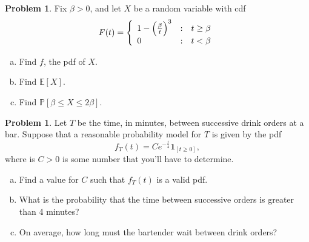 \documentclass[10pt]{article}
\theoremstyle{definition}
\newtheorem{problem}[theorem]{Problem}
\newcommand{\1}[1]{\textbf{1}_{\left[#1\right]}} %
\def\E{\mathbb{E}} %
\def\P{\mathbb{P}} %
\begin{document}
\begin{problem}
  Fix $\beta>0$, and let $X$ be a random variable with cdf
  \begin{equation*}
    F(t) = \left\{ \begin{array}{l@{\quad:\quad}l} 1- \left( \frac{\beta}{t} \right)^{3}  & t \geq \beta\\ 0& t<\beta\end{array}\right.
  \end{equation*}
  \begin{enumerate}[(a)]
    \item Find $f$, the pdf of $X$.
    \item Find $\E\left[X \right]$.
    \item Find $\P\left[\beta \leq X \leq 2\beta\right]$.
  \end{enumerate}
\end{problem}


\begin{problem}%
  Let $T$ be the time, in minutes, between successive drink orders at a bar. Suppose that a reasonable
  probability model for $T$ is given by the pdf
  \begin{equation*}
    f_{T}(t) = Ce^{-\frac{t}{4}} \mathbf{1}_{\left[ t \geq 0\right] },
  \end{equation*}
  where is $C>0$ is some number that you'll have to determine.
  \begin{enumerate}[(a)]
    \item Find a value for $C$ such that $f_{T}(t)$ is a valid pdf.
    \item What is the probability that the time between successive orders is greater than 4 minutes?
    \item On average, how long must the bartender wait between drink orders?
  \end{enumerate}
\end{problem}
\end{document}
